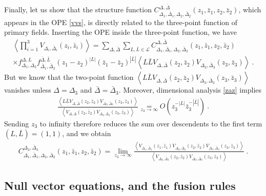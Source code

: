 \documentclass[12pt, a4paper, notitlepage, twoside]{report}
\numberwithin{equation}{section}
\theoremstyle{break}
\begin{document}
Finally, let us show that the structure function $C_{\Delta_1,\bar{\Delta}_1,\Delta_2,\bar{\Delta}_2}^{\Delta,\bar{\Delta}}(z_1,\bar{z}_1,z_2,\bar{z}_2)$, which appears in the OPE \eqref{vvs}, is directly related to the three-point function of primary fields.
Inserting the OPE inside the three-point function, we have 
\begin{multline}
 \left\langle \prod_{i=1}^3 V_{\Delta_i,\bar{\Delta}_i}(z_i,\bar{z}_i) \right\rangle = \sum_{\Delta,\bar{\Delta}}\sum_{L,\bar{L}\in \mathcal{L}} 
 C_{\Delta_1,\bar{\Delta}_1,\Delta_2,\bar{\Delta}_2}^{\Delta,\bar{\Delta}}(z_1,\bar{z}_1,z_2,\bar{z}_2)
\\ \times
 f_{\Delta_1,\Delta_2}^{\Delta,L} f_{\bar{\Delta}_1,\bar{\Delta}_2}^{\bar{\Delta},\bar{L}} (z_1-z_2)^{|L|} (\bar{z}_1-\bar{z}_2)^{|\bar{L}|}
 \left\langle L\bar{L} V_{\Delta,\bar{\Delta}}(z_2,\bar{z}_2) V_{\Delta_3,\bar{\Delta}_3}(z_3,\bar{z}_3)\right\rangle\ .
\end{multline}
But we know that the two-point function $\left\langle L\bar{L} V_{\Delta,\bar{\Delta}}(z_2,\bar{z}_2) V_{\Delta_3,\bar{\Delta}_3}(z_3,\bar{z}_3)\right\rangle$ vanishes unless $\Delta=\Delta_3$ and $\bar{\Delta}=\bar{\Delta}_3$.
Moreover, dimensional analysis \eqref{zaz} implies 
\begin{align}
 \frac{\left\langle L\bar{L} V_{\Delta,\bar{\Delta}}(z_2,\bar{z}_2) V_{\Delta_3,\bar{\Delta}_3}(z_3,\bar{z}_3)\right\rangle }{\left\langle V_{\Delta,\bar{\Delta}}(z_2,\bar{z}_2) V_{\Delta_3,\bar{\Delta}_3}(z_3,\bar{z}_3)\right\rangle } \underset{z_3\to \infty}{=} O\left(z_3^{-|L|}\bar{z}_3^{-|\bar{L}|}\right)\ .
\end{align}
Sending $z_3$ to infinity therefore reduces the sum over descendents to the first term $(L,\bar{L})=(1,1)$, and we obtain
\begin{align}
C_{\Delta_1,\bar{\Delta}_1,\Delta_2,\bar{\Delta}_2}^{\Delta_3,\bar{\Delta}_3}(z_1,\bar{z}_1,z_2,\bar{z}_2) =\underset{z_3\to \infty}{\lim} \frac{\left\langle V_{\Delta_1,\bar{\Delta}_1}(z_1,\bar{z}_1) V_{\Delta_2,\bar{\Delta}_2}(z_2,\bar{z}_2)  V_{\Delta_3,\bar{\Delta}_3}(z_3,\bar{z}_3)\right\rangle}{\left\langle V_{\Delta_3,\bar{\Delta}_3}(z_2,\bar{z}_2)  V_{\Delta_3,\bar{\Delta}_3}(z_3,\bar{z}_3)\right\rangle}\ .
\label{cftt}
\end{align}


\subsection{Null vector equations, and the fusion rules}
\end{document}

